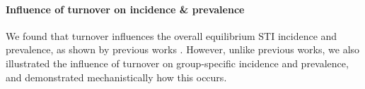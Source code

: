 \paragraph{Influence of turnover on incidence \& prevalence}
%
We found that turnover influences the overall equilibrium STI incidence and prevalence,
as shown by previous works \citep{Stigum1994,Zhang2012,Henry2015}.
However, unlike previous works, we also illustrated the influence of turnover on
group-specific incidence and prevalence, and demonstrated mechanistically how this occurs.
